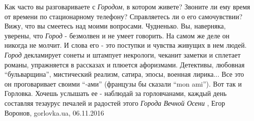 Как часто вы разговариваете с \emph{Городом}, в котором живете? Звоните ли ему
время от времени по стационарному телефону? Справляетесь ли о его самочувствии?
Вижу, что вы смеетесь над моими вопросами.  Чудненько. Вы, наверняка, уверены,
что \emph{Город} - безмолвен и не умеет говорить. На самом же деле он никогда
не молчит.  И слова его - это поступки и чувства живущих в нем людей.
\emph{Город} декламирует сонеты и штампует некрологи, чеканит заметки и
сплетает романы, упражняется в рассказах и плюется афоризмами. Детективы,
любовная \enquote{бульварщина}, мистический реализм, сатира, эпосы, военная
лирика...  Все это он проговаривает своими \enquote{-ами} (французы бы
сказали \enquote{mon ami}). Вот так и Горловка. Хочешь услышать ее - наблюдай
за горловчанами, каждый день составляя тезаурус печалей и радостей этого
\emph{Города Вечной Осени}
, 
Егор Воронов, gorlovka.ua, 06.11.2016

